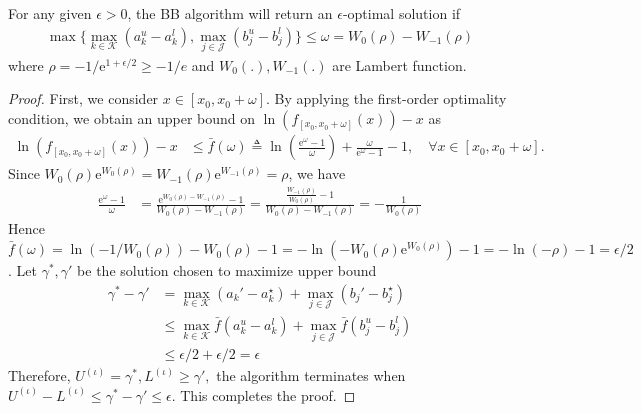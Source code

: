 \documentclass[10pt,a4paper]{amsart}
\begin{document}
\begin{lemma}
For any given $\epsilon > 0$, the BB algorithm will return an $\epsilon$-optimal solution if
\begin{align}
\max \{ \max_{k \in \mathcal{K}} (a_{k}^u - a_{k}^l), \max_{j \in \mathcal{J}} (b_{j}^u - b_{j}^l) \} \le \omega = W_0 (\rho) - W_{-1} (\rho)
\end{align}
where $\rho = -1/\mathrm{e}^{1+\epsilon/2} \ge -1/e$ and $W_0(.), W_{-1} (.) $ are Lambert function. 
\end{lemma} 

\begin{proof}
First, we consider $x \in [x_0, x_0 + \omega]$. By applying the first-order optimality condition, we obtain an upper bound on $\ln (f_{[x_0, x_0 + \omega]} (x)) - x$ as
\begin{align}
\ln (f_{[x_0, x_0 + \omega]} (x)) - x 
&\le \bar{f} (\omega) \triangleq  \ln \!\left(\frac{\mathrm{e}^\omega-1}{\omega}\right) + \frac{\omega}{\mathrm{e}^\omega-1} - 1, \quad \forall x \in [x_0, x_0 + \omega ].
\end{align}
Since $W_0 (\rho) \mathrm{e}^{W_0 (\rho)} = W_{-1} (\rho) \mathrm{e}^{W_{-1} (\rho)} = \rho $, we have
\begin{align}
\frac{\mathrm{e}^\omega-1}{\omega} &= \frac{\mathrm{e}^{W_0 (\rho) - W_{-1} (\rho)} -1}{W_0 (\rho) - W_{-1} (\rho)} = \frac{\frac{{W_{-1} (\rho)}}{{W_{0} (\rho)}} - 1}{W_0 (\rho) - W_{-1} (\rho)}  = -\frac{1}{W_0(\rho)}
\end{align}
Hence $ \bar{f} (\omega) = \ln \left(- {1}/{W_0(\rho)} \right) - {W_0(\rho)} -1 = -\ln (- {W_0(\rho)} \mathrm{e}^{{W_0(\rho)}} ) -1 = -\ln (- \rho) -1 = \epsilon/2 $. Let $\gamma^*, \gamma'$ be the solution chosen to maximize upper bound 
\begin{align}
\gamma^* - \gamma' &= \max_{k \in \mathcal{K}} (a_k' - a_k^\star) + \max_{j \in \mathcal{J}} (b_j' - b_j^\star) \\
& \le \max_{k \in \mathcal{K}} \bar{f} ( a_k^u - a_k^l) + \max_{j \in \mathcal{J}} \bar{f} ( b_j^u - b_j^l) \\
& \le \epsilon/2 + \epsilon/2 = \epsilon
\end{align}
Therefore, $U^{(\iota)} = \gamma^*, L^{(\iota)} \ge \gamma',$ the algorithm terminates when $U^{(\iota)} - L^{(\iota)} \le \gamma^* -\gamma' \le \epsilon$. This completes the proof.
\end{proof}
\end{document}
